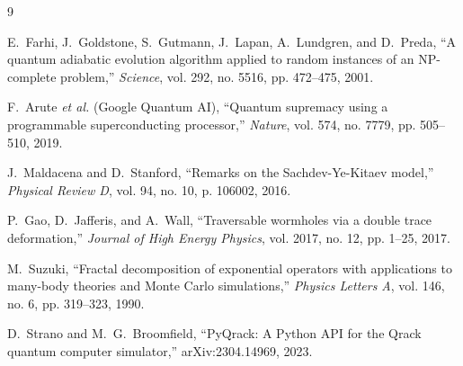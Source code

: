 \documentclass[11pt,a4paper]{article}
\begin{document}

\begin{thebibliography}{9}

E.~Farhi, J.~Goldstone, S.~Gutmann, J.~Lapan, A.~Lundgren, and D.~Preda,
``A quantum adiabatic evolution algorithm applied to random instances of an NP-complete problem,''
\textit{Science}, vol. 292, no. 5516, pp. 472--475, 2001.

F.~Arute \textit{et al.} (Google Quantum AI),
``Quantum supremacy using a programmable superconducting processor,''
\textit{Nature}, vol. 574, no. 7779, pp. 505--510, 2019.

J.~Maldacena and D.~Stanford,
``Remarks on the Sachdev-Ye-Kitaev model,''
\textit{Physical Review D}, vol. 94, no. 10, p. 106002, 2016.

P.~Gao, D.~Jafferis, and A.~Wall,
``Traversable wormholes via a double trace deformation,''
\textit{Journal of High Energy Physics}, vol. 2017, no. 12, pp. 1--25, 2017.

M.~Suzuki,
``Fractal decomposition of exponential operators with applications to many-body theories and Monte Carlo simulations,''
\textit{Physics Letters A}, vol. 146, no. 6, pp. 319--323, 1990.

D.~Strano and M.~G.~Broomfield,
``PyQrack: A Python API for the Qrack quantum computer simulator,''
arXiv:2304.14969, 2023.

\end{thebibliography}
\end{document}
